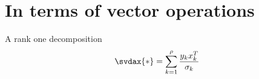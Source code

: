 \section[Vector operations]{In terms of vector operations}

A rank one decomposition
\begin{equation}
  \svdax{*} = \sum_{k=1}^{\rho}{\frac{y_{k}x_{k}^{T}}{\sigma_{k}}}
\end{equation}


\endinput